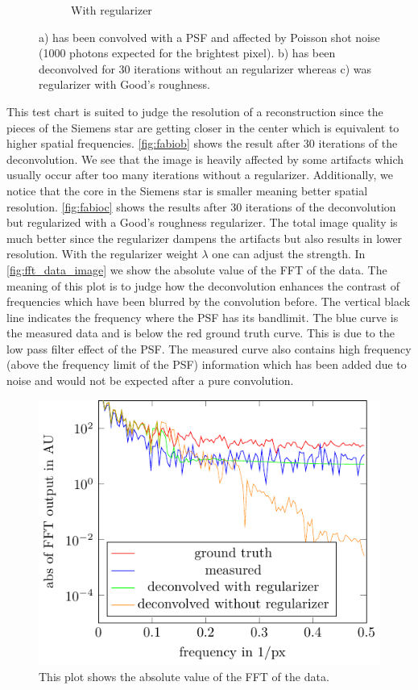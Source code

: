 \documentclass{juliacon}
\begin{document}
\begin{figure}[h]
\begin{subfigure}[b]{.166\textwidth}
                \caption{With regularizer}
                \label{fig:fabioc}
            \end{subfigure}%
            \caption{a) has been convolved with a PSF and affected by Poisson shot noise (1000 photons expected for the brightest pixel). b) has been deconvolved for 30 iterations without an regularizer whereas c) was regularizer with Good's roughness.}
            \label{fig:image}
        \end{figure}

        This test chart is suited to judge the resolution of a reconstruction since the pieces of the Siemens star
        are getting closer in the center which is equivalent to higher spatial frequencies.
        \autoref{fig:fabiob} shows the result after 30 iterations of the deconvolution. 
        We see that the image is heavily affected by some artifacts which usually occur after too many iterations without a regularizer.
        Additionally, we notice that the core in the Siemens star is smaller meaning better spatial resolution. 
        \autoref{fig:fabioc} shows the results after 30 iterations of the deconvolution but regularized with a Good's roughness regularizer.
        The total image quality is much better since the regularizer dampens the artifacts but also results in lower
        resolution. With the regularizer weight $\lambda$ one can adjust the strength.
        In \autoref{fig:fft_data_image} we show the absolute value of the FFT of the data. 
        The meaning of this plot is to judge how the deconvolution enhances the contrast of frequencies which have 
        been blurred by the convolution before.
        The vertical black line indicates the frequency where the PSF has its bandlimit.
        The blue curve is the measured data and is below the red ground truth curve. This is due to the low pass filter effect of the PSF.
        The measured curve also contains high frequency (above the frequency limit of the PSF) information which has been added due to noise and would not be expected 
        after a pure convolution.
        \begin{figure}[h]
            \centering
            \includegraphics[width = .4\textwidth]{figures/frequencies_img.pdf}
            \caption{This plot shows the absolute value of the FFT of the data.}
            \label{fig:fft_data_image}
        \end{figure}
\end{document}
